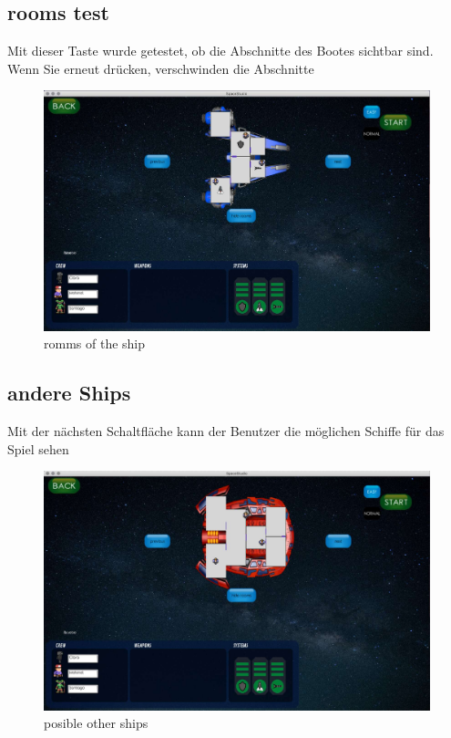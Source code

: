 \documentclass[12pt]{article}
\begin{document}
\subsection{rooms test}

Mit dieser Taste wurde getestet, ob die Abschnitte des Bootes sichtbar sind. Wenn Sie erneut drücken, verschwinden die Abschnitte\\
\begin{figure}
\centering
\includegraphics[scale=0.4]{TestProtocolBilder/shipRooms.jpg}
\caption{romms of the ship}
\end{figure}

\newpage

\subsection{andere Ships}
Mit der nächsten Schaltfläche kann der Benutzer die möglichen Schiffe für das Spiel sehen
\begin{figure}
\centering
\includegraphics[scale=0.4]{TestProtocolBilder/next.jpg}
\caption{posible other ships}
\end{figure}
\end{document}
